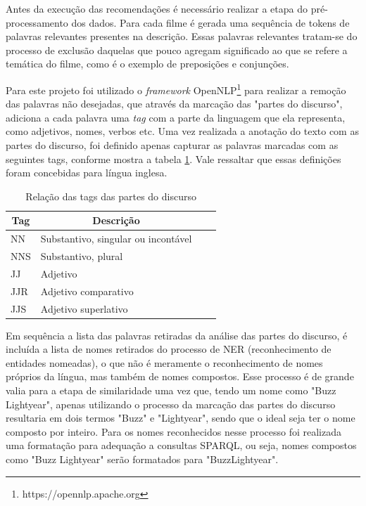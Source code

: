 Antes da execução das recomendações é necessário realizar a etapa do pré-processamento dos dados. Para cada filme é gerada uma sequência de tokens de palavras relevantes presentes na descrição. Essas palavras relevantes tratam-se do processo de exclusão daquelas que pouco agregam significado ao que se refere a temática do filme, como é o exemplo de preposições e conjunções. 

Para este projeto foi utilizado o \textit{framework} OpenNLP\footnote{https://opennlp.apache.org} para realizar a remoção das palavras não desejadas, que através da marcação das "partes do discurso", adiciona a cada palavra uma \textit{tag} com a parte da linguagem que ela representa, como adjetivos, nomes, verbos etc. Uma vez realizada a anotação do texto com as partes do discurso, foi definido apenas capturar as palavras marcadas com as seguintes tags, conforme mostra a tabela \ref{tab:nlp_tags}. Vale ressaltar que essas definições foram concebidas para língua inglesa.

\begin{table}[H]
	\label{tab:nlp_tags}
	\centering
	\caption{Relação das tags das partes do discurso}
	\def\arraystretch{1.3} %
	\begin{tabular}{| m{1.3cm} | m{9.4cm}| c | m{2cm}}
		\hline
		\multicolumn{1}{|c|}{\bfseries Tag} & \multicolumn{1}{c|}{\bfseries Descrição} \\ \hline
		NN & Substantivo, singular ou incontável \\ \hline 
		NNS	& Substantivo, plural \\ \hline
		JJ & Adjetivo \\ \hline
		JJR & Adjetivo comparativo \\ \hline
		JJS & Adjetivo superlativo \\ \hline
	\end{tabular}
\end{table}

Em sequência a lista das palavras retiradas da análise das partes do discurso, é incluída a lista de nomes retirados do processo de \ac{NER} (reconhecimento de entidades nomeadas), o que não é meramente o reconhecimento de nomes próprios da língua, mas também de nomes compostos. Esse processo é de grande valia para a etapa de similaridade uma vez que, tendo um nome como "Buzz Lightyear", apenas utilizando o processo da marcação das partes do discurso resultaria em dois termos "Buzz" e "Lightyear", sendo que o ideal seja ter o nome composto por inteiro. Para os nomes reconhecidos nesse processo foi realizada uma formatação para adequação a consultas \ac{SPARQL}, ou seja, nomes compostos como "Buzz Lightyear" serão formatados para "Buzz\textunderscore Lightyear".

